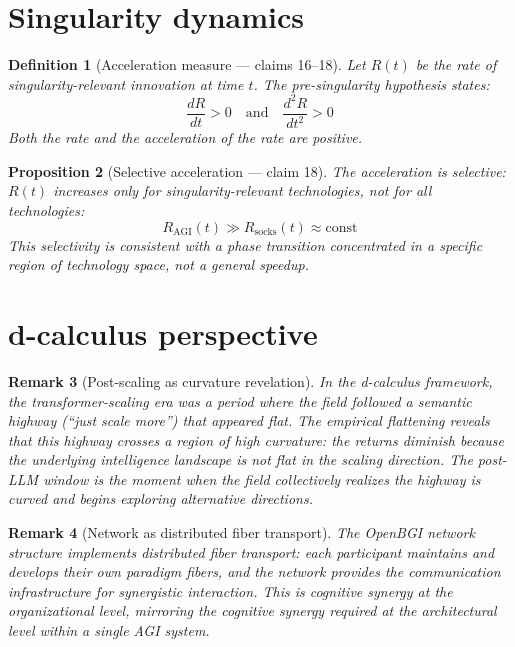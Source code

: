\documentclass[11pt,a4paper]{article}
\newtheorem{definition}{Definition}[section]
\newtheorem{proposition}[definition]{Proposition}
\newtheorem{remark}[definition]{Remark}
\begin{document}
\section{Singularity dynamics}
\label{sec:singularity}

\begin{definition}[Acceleration measure --- claims 16--18]
\label{def:acceleration}
Let $R(t)$ be the rate of singularity-relevant innovation at time $t$.
The pre-singularity hypothesis states:
\[
  \frac{dR}{dt} > 0 \quad \text{and} \quad
  \frac{d^2 R}{dt^2} > 0
\]
Both the rate and the acceleration of the rate are positive.
\end{definition}

\begin{proposition}[Selective acceleration --- claim 18]
\label{prop:selective}
The acceleration is selective: $R(t)$ increases only for
singularity-relevant technologies, not for all technologies:
\[
  R_{\text{AGI}}(t) \gg R_{\text{socks}}(t) \approx \text{const}
\]
This selectivity is consistent with a phase transition concentrated
in a specific region of technology space, not a general speedup.
\end{proposition}

\section{d-calculus perspective}
\label{sec:d-calc}

\begin{remark}[Post-scaling as curvature revelation]
In the d-calculus framework, the transformer-scaling era was a period
where the field followed a semantic highway (``just scale more'') that
appeared flat. The empirical flattening reveals that this highway
crosses a region of high curvature: the returns diminish because
the underlying intelligence landscape is not flat in the scaling
direction. The post-LLM window is the moment when the field
collectively realizes the highway is curved and begins exploring
alternative directions.
\end{remark}

\begin{remark}[Network as distributed fiber transport]
The OpenBGI network structure implements distributed fiber transport:
each participant maintains and develops their own paradigm fibers,
and the network provides the communication infrastructure for
synergistic interaction. This is cognitive synergy at the
organizational level, mirroring the cognitive synergy required
at the architectural level within a single AGI system.
\end{remark}
\end{document}
